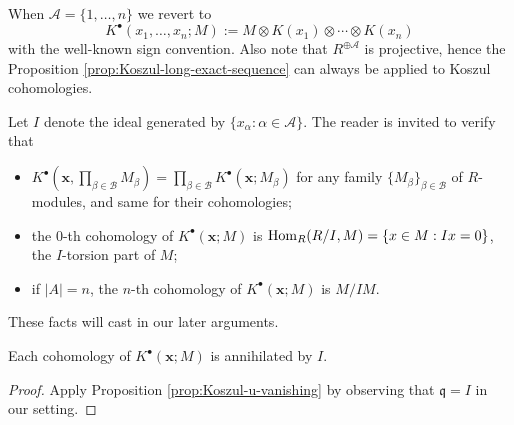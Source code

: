 When $\mathcal{A} = \{1, \ldots, n\}$ we revert to
\[ K^\bullet(x_1, \ldots, x_n; M) := M \otimes K(x_1) \otimes \cdots \otimes K(x_n) \]
with the well-known sign convention. Also note that $R^{\oplus \mathcal{A}}$ is projective, hence the Proposition \ref{prop:Koszul-long-exact-sequence} can always be applied to Koszul cohomologies.

Let $I$ denote the ideal generated by $\{x_\alpha: \alpha \in \mathcal{A} \}$. The reader is invited to verify that
\begin{itemize}
	\item $K^\bullet\left( \mathbf{x}, \prod_{\beta \in \mathcal{B}} M_\beta \right) = \prod_{\beta \in \mathcal{B}} K^\bullet(\mathbf{x}; M_\beta)$ for any family $\{M_\beta\}_{\beta \in \mathcal{B}}$ of $R$-modules, and same for their cohomologies;
	\item the $0$-th cohomology of $K^\bullet(\mathbf{x}; M)$ is $\operatorname{Hom}_R(R/I, M) = \{x \in M: Ix=0 \}$, the $I$-torsion part of $M$;
	\item if $|A| = n$, the $n$-th cohomology of $K^\bullet(\mathbf{x}; M)$ is $M/IM$.
\end{itemize}
These facts will cast in our later arguments.

\begin{lemma}\label{prop:Koszul-coho-ann}
	Each cohomology of $K^\bullet(\mathbf{x}; M)$ is annihilated by $I$.
\end{lemma}
\begin{proof}
	Apply Proposition \ref{prop:Koszul-u-vanishing} by observing that $\mathfrak{q} = I$ in our setting.
\end{proof}

